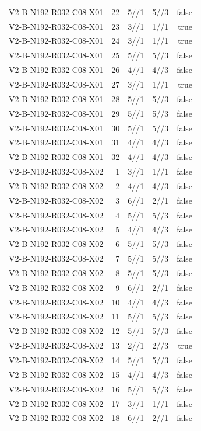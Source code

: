 {\begin{longtable}{lrrrr}
V2-B-N192-R032-C08-X01 & 22 & 5//1 & 5//3 & false \\
V2-B-N192-R032-C08-X01 & 23 & 3//1 & 1//1 & true \\
V2-B-N192-R032-C08-X01 & 24 & 3//1 & 1//1 & true \\
V2-B-N192-R032-C08-X01 & 25 & 5//1 & 5//3 & false \\
V2-B-N192-R032-C08-X01 & 26 & 4//1 & 4//3 & false \\
V2-B-N192-R032-C08-X01 & 27 & 3//1 & 1//1 & true \\
V2-B-N192-R032-C08-X01 & 28 & 5//1 & 5//3 & false \\
V2-B-N192-R032-C08-X01 & 29 & 5//1 & 5//3 & false \\
V2-B-N192-R032-C08-X01 & 30 & 5//1 & 5//3 & false \\
V2-B-N192-R032-C08-X01 & 31 & 4//1 & 4//3 & false \\
V2-B-N192-R032-C08-X01 & 32 & 4//1 & 4//3 & false \\
V2-B-N192-R032-C08-X02 & 1 & 3//1 & 1//1 & false \\
V2-B-N192-R032-C08-X02 & 2 & 4//1 & 4//3 & false \\
V2-B-N192-R032-C08-X02 & 3 & 6//1 & 2//1 & false \\
V2-B-N192-R032-C08-X02 & 4 & 5//1 & 5//3 & false \\
V2-B-N192-R032-C08-X02 & 5 & 4//1 & 4//3 & false \\
V2-B-N192-R032-C08-X02 & 6 & 5//1 & 5//3 & false \\
V2-B-N192-R032-C08-X02 & 7 & 5//1 & 5//3 & false \\
V2-B-N192-R032-C08-X02 & 8 & 5//1 & 5//3 & false \\
V2-B-N192-R032-C08-X02 & 9 & 6//1 & 2//1 & false \\
V2-B-N192-R032-C08-X02 & 10 & 4//1 & 4//3 & false \\
V2-B-N192-R032-C08-X02 & 11 & 5//1 & 5//3 & false \\
V2-B-N192-R032-C08-X02 & 12 & 5//1 & 5//3 & false \\
V2-B-N192-R032-C08-X02 & 13 & 2//1 & 2//3 & true \\
V2-B-N192-R032-C08-X02 & 14 & 5//1 & 5//3 & false \\
V2-B-N192-R032-C08-X02 & 15 & 4//1 & 4//3 & false \\
V2-B-N192-R032-C08-X02 & 16 & 5//1 & 5//3 & false \\
V2-B-N192-R032-C08-X02 & 17 & 3//1 & 1//1 & false \\
V2-B-N192-R032-C08-X02 & 18 & 6//1 & 2//1 & false \\

\end{longtable}}
